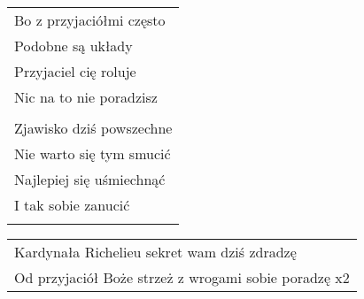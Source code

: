 \documentclass[a5paper]{article}
\begin{document}
\noindent
\begin{tabular}{@{}p{9.50cm}@{}}
Bo z przyjaciółmi często \\
Podobne są układy \\
Przyjaciel cię roluje \\
Nic na to nie poradzisz \\ \\

Zjawisko dziś powszechne \\
Nie warto się tym smucić \\
Najlepiej się uśmiechnąć \\
I tak sobie zanucić \\ \\
\end{tabular}

\noindent
\begin{tabular}{@{}p{8.50cm}@{}}
Kardynała Richelieu sekret wam dziś zdradzę \\
Od przyjaciół Boże strzeż z wrogami sobie poradzę x2
\end{tabular}
\end{document}

